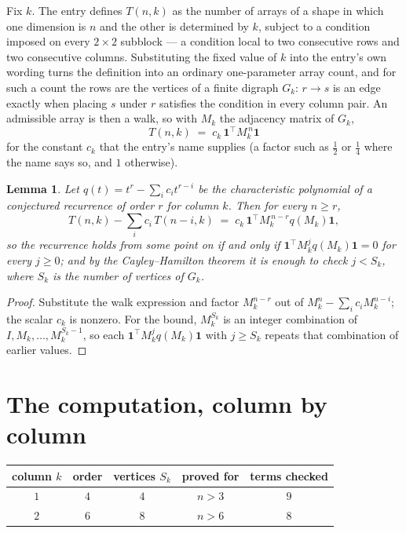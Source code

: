 \documentclass[11pt,a4paper]{article}
\theoremstyle{plain}
\newtheorem{lemma}[theorem]{Lemma}
\theoremstyle{definition}
\begin{document}
Fix $k$. The entry defines $T(n,k)$ as the number of arrays of a shape in which one dimension
is $n$ and the other is determined by $k$, subject to a condition imposed on every
$2\times2$ subblock --- a condition local to two consecutive rows and two consecutive columns.
Substituting the fixed value of $k$ into the entry's own wording turns the definition into an
ordinary one-parameter array count, and for such a count the rows are the vertices of a finite
digraph $G_k$: $r\to s$ is an edge exactly when placing $s$ under $r$ satisfies the condition
in every column pair. An admissible array is then a walk, so with $M_k$ the adjacency matrix
of $G_k$,
\[
T(n,k)\;=\;c_k\,\mathbf{1}^{\!\top}M_k^{\,n}\mathbf{1}
\]
for the constant $c_k$ that the entry's name supplies (a factor such as $\tfrac12$ or
$\tfrac14$ where the name says so, and $1$ otherwise).

\begin{lemma}\label{lem:crit}
Let $q(t)=t^{r}-\sum_i c_it^{r-i}$ be the characteristic polynomial of a conjectured
recurrence of order $r$ for column $k$. Then for every $n\ge r$,
\[
T(n,k)-\sum_i c_i\,T(n-i,k)\;=\;c_k\,\mathbf{1}^{\!\top}M_k^{\,n-r}q(M_k)\mathbf{1},
\]
so the recurrence holds from some point on if and only if
$\mathbf{1}^{\!\top}M_k^{j}q(M_k)\mathbf{1}=0$ for every $j\ge0$; and by the
Cayley--Hamilton theorem it is enough to check $j<S_k$, where $S_k$ is the number of vertices
of $G_k$.
\end{lemma}

\begin{proof}
Substitute the walk expression and factor $M_k^{n-r}$ out of $M_k^{n}-\sum_ic_iM_k^{n-i}$;
the scalar $c_k$ is nonzero. For the bound, $M_k^{S_k}$ is an integer combination of
$I,M_k,\dots,M_k^{S_k-1}$, so each $\mathbf{1}^{\!\top}M_k^{j}q(M_k)\mathbf{1}$ with
$j\ge S_k$ repeats that combination of earlier values.
\end{proof}

\section{The computation, column by column}

\begin{center}
\begin{tabular}{ccccc}
column $k$ & order & vertices $S_k$ & proved for & terms checked \\ \hline
$1$ & $4$ & $4$ & $n>3$ & $9$ \\
$2$ & $6$ & $8$ & $n>6$ & $8$ \\
\end{tabular}
\end{center}
\end{document}
